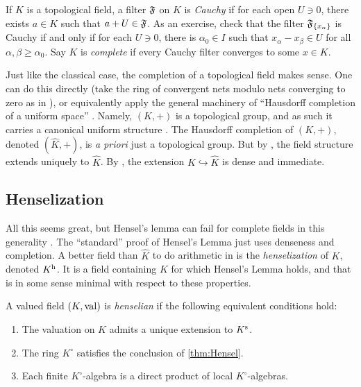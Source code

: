 If $K$ is a topological field, a filter $\mathfrak{F}$ on $K$ is \emph{Cauchy} if for 
each open $U\ni 0$, there exists $a\in K$ such that $a+U\in \mathfrak{F}$. As an 
exercise, check that the filter $\mathfrak{F}_{\{x_\alpha\}}$ is Cauchy if and only if 
for each $U\ni 0$, there is $\alpha_0\in I$ such that 
$x_\alpha-x_\beta\in U$ for all $\alpha,\beta\geqslant \alpha_0$. Say $K$ is 
\emph{complete} if every Cauchy filter converges to some $x\in K$. 

Just like the classical case, the completion of a topological field makes 
sense. One can do this directly (take the ring of convergent nets modulo nets 
converging to zero as in \cite[2.4.3]{engler-prestel}), or equivalently apply 
the general machinery of ``Hausdorff completion of a uniform space'' 
\cite[II \S 3.7]{bourbaki-gentop1}. Namely, $(K,+)$ is a topological group, 
and as such it carries a canonical uniform structure 
\cite[III \S 3]{bourbaki-gentop1}. The Hausdorff completion of $(K,+)$, denoted 
$(\widehat K,+)$, is \emph{a priori} just a topological group. But by 
\cite[III \S 6.8]{bourbaki-gentop1}, the field structure extends uniquely to 
$\widehat K$. By \cite[2.4.4]{engler-prestel}, the extension 
$K\hookrightarrow \widehat K$ is dense and immediate.


\subsection{Henselization}\label{sec:henselization}

All this seems great, but Hensel's lemma can fail for complete fields in this 
generality \cite[2.4.6]{engler-prestel}. The ``standard'' proof of Hensel's 
Lemma just uses denseness and completion. A better field than $\widehat K$ to 
do arithmetic in is the \emph{henselization} of $K$, denoted 
$K^{\mathrm{h}}$. It is a field containing $K$ for which Hensel's Lemma 
holds, and that is in some sense minimal with respect to these properties. 

\begin{definition}
A valued field $(K,\operatorname{val})$ is \emph{henselian} if the following equivalent 
conditions hold:
\begin{enumerate}
\item
The valuation on $K$ admits a unique extension to $K^{\mathrm{s}}$. 

\item
The ring $K^\circ$ satisfies the conclusion of \autoref{thm:Hensel}. 

\item
Each finite $K^\circ$-algebra is a direct product of local $K^\circ$-algebras. 
\end{enumerate}
\end{definition}

